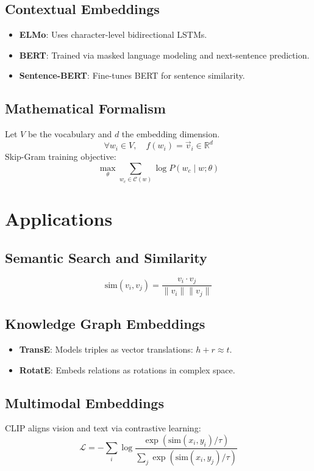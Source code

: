 \documentclass{article}
\begin{document}
\subsection{Contextual Embeddings}
\begin{itemize}
  \item \textbf{ELMo}: Uses character-level bidirectional LSTMs.
  \item \textbf{BERT}: Trained via masked language modeling and next-sentence prediction.
  \item \textbf{Sentence-BERT}: Fine-tunes BERT for sentence similarity.
\end{itemize}

\subsection{Mathematical Formalism}
Let $V$ be the vocabulary and $d$ the embedding dimension.
\[
\forall w_i \in V, \quad f(w_i) = \vec{v}_i \in \mathbb{R}^d
\]
Skip-Gram training objective:
\[
\max_\theta \sum_{w_c \in \mathcal{C}(w)} \log P(w_c \mid w; \theta)
\]

\section{Applications}

\subsection{Semantic Search and Similarity}
\[
\text{sim}(v_i, v_j) = \frac{v_i \cdot v_j}{\|v_i\| \|v_j\|}
\]

\subsection{Knowledge Graph Embeddings}
\begin{itemize}
  \item \textbf{TransE}: Models triples as vector translations: $h + r \approx t$.
  \item \textbf{RotatE}: Embeds relations as rotations in complex space.
\end{itemize}

\subsection{Multimodal Embeddings}
CLIP aligns vision and text via contrastive learning:
\[
\mathcal{L} = -\sum_i \log \frac{\exp(\text{sim}(x_i, y_i)/\tau)}{\sum_j \exp(\text{sim}(x_i, y_j)/\tau)}
\]
\end{document}
